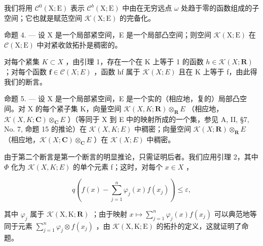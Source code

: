 我们将用 \(\mathcal{C}^{0}(\mathrm{X};\mathrm{E})\) 表示 \(\mathcal{C}^{b}(\mathrm{X};\mathrm{E})\) 中由在无穷远点 \(\omega\) 处趋于零的函数组成的子空间；它也就是赋范空间 \(\mathcal{K}(\mathrm{X};\mathrm{E})\) 的完备化。

命题 4. --- 设 X 是一个局部紧空间，E 是一个局部凸空间；则空间 \(\mathcal{K}(\mathrm{X};\mathrm{E})\) 在 \(\mathcal{C}(\mathrm{X};\mathrm{E})\) 中对紧收敛拓扑是稠密的。

对每个紧集 \(K \subset X\) ，由引理 1，存在一个在 K 上等于 1 的函数 \(h \in \mathcal{K}(X; \mathbf{R})\) ；对每个函数 \(\mathbf{f} \in \mathcal{C}(X; E)\) ，函数 hf 属于 \(\mathcal{K}(X; E)\) 且在 K 上等于 f，由此得我们的断言。

命题 5. --- 设 X 是一个局部紧空间，E 是一个实的（相应地，复的）局部凸空间。对 X 的每个紧子集 K，向量空间 \(\mathcal{K}(X,K;\mathbf{R})\otimes_{\mathbf{R}}E\) （相应地，\(\mathcal{K}(X,K;\mathbf{C})\otimes_{\mathbf{C}}E\) ）（等同于 X 到 E 中的映射所成的一个集，参见 A, II, §7, No. 7, 命题 15 的推论）在 \(\mathcal{K}(X,K;E)\) 中稠密；向量空间 \(\mathcal{K}(X;\mathbf{R})\otimes_{\mathbf{R}}E\) （相应地，\(\mathcal{K}(X;\mathbf{C})\otimes_{\mathbf{C}}E\) ）在 \(\mathcal{K}(X;E)\) 中稠密。

由于第二个断言是第一个断言的明显推论，只需证明后者。我们应用引理 2，其中 \(\Phi\) 化为 \(\mathcal{K}(X,K;E)\) 的单个元素 f；这时，对每个 \(x\in X\) ，

\[
q \left(f (x) - \sum_ {j = 1} ^ {n} \varphi_ {j} (x) f \left(x _ {j}\right)\right) \leqslant \varepsilon ,
\]

其中 \(\varphi_{j}\) 属于 \(\mathcal{K}(\mathrm{X},\mathrm{K};\mathbf{R})\) ；由于映射 \(x\mapsto \sum_{j = 1}^{n}\varphi_{j}(x)f(x_{j})\) 可以典范地等同于元素 \(\sum_{j = 1}^{n}\varphi_{j}\otimes f(x_{j})\) ，由 \(\mathcal{K}(\mathrm{X},\mathrm{K};\mathrm{E})\) 的拓扑的定义，这就证明了命题。


